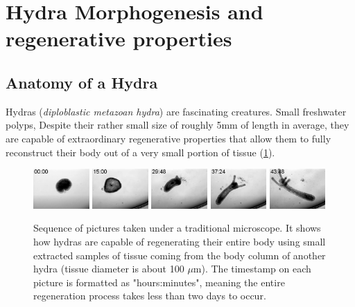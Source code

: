
\section{Hydra Morphogenesis and regenerative properties}

\subsection{Anatomy of a Hydra}

Hydras (\textit{diploblastic metazoan hydra}) are fascinating creatures. Small freshwater polyps, Despite their rather small size of roughly 5mm of length in average, they are capable of extraordinary regenerative properties that allow them to fully reconstruct their body out of a very small portion of tissue (\ref{hydraregen}).
\begin{figure}[h]
\label{hydraregen}
\includegraphics[width=0.19\textwidth]{figures/hydra_growth1}
\includegraphics[width=0.19\textwidth]{figures/hydra_growth2}
\includegraphics[width=0.19\textwidth]{figures/hydra_growth3}	\includegraphics[width=0.19\textwidth]{figures/hydra_growth4}
\includegraphics[width=0.19\textwidth]{figures/hydra_growth5}
\caption{Sequence of pictures taken under a traditional microscope. It shows how hydras are capable of regenerating their entire body using small extracted samples of tissue coming from the body column of another hydra (tissue diameter is about 100 $\mu$m). The timestamp on each picture is formatted as "hours:minutes", meaning the entire regeneration process takes less than two days to occur.}
\end{figure}

